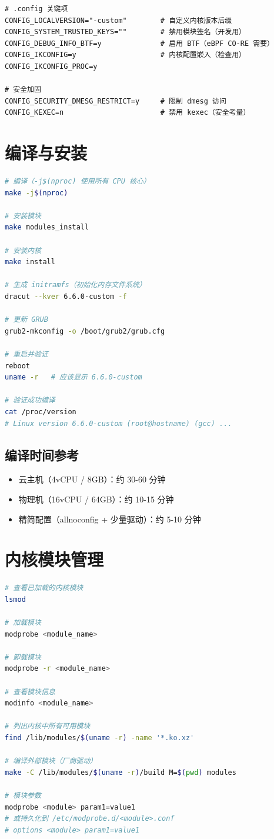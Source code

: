 \documentclass[12pt,UTF8]{ctexbook}
\begin{document}
\begin{lstlisting}
# .config 关键项
CONFIG_LOCALVERSION="-custom"        # 自定义内核版本后缀
CONFIG_SYSTEM_TRUSTED_KEYS=""        # 禁用模块签名（开发用）
CONFIG_DEBUG_INFO_BTF=y              # 启用 BTF（eBPF CO-RE 需要）
CONFIG_IKCONFIG=y                    # 内核配置嵌入（检查用）
CONFIG_IKCONFIG_PROC=y

# 安全加固
CONFIG_SECURITY_DMESG_RESTRICT=y     # 限制 dmesg 访问
CONFIG_KEXEC=n                       # 禁用 kexec（安全考量）
\end{lstlisting}

\section{编译与安装}
\label{sec:kernel-build}

\begin{lstlisting}[language=bash]
# 编译（-j$(nproc) 使用所有 CPU 核心）
make -j$(nproc)

# 安装模块
make modules_install

# 安装内核
make install

# 生成 initramfs（初始化内存文件系统）
dracut --kver 6.6.0-custom -f

# 更新 GRUB
grub2-mkconfig -o /boot/grub2/grub.cfg

# 重启并验证
reboot
uname -r   # 应该显示 6.6.0-custom

# 验证成功编译
cat /proc/version
# Linux version 6.6.0-custom (root@hostname) (gcc) ...
\end{lstlisting}

\subsection*{编译时间参考}

\begin{itemize}
    \item 云主机（4vCPU / 8GB）：约 30-60 分钟
    \item 物理机（16vCPU / 64GB）：约 10-15 分钟
    \item 精简配置（allnoconfig + 少量驱动）：约 5-10 分钟
\end{itemize}

\section{内核模块管理}
\label{sec:kernel-modules}

\begin{lstlisting}[language=bash]
# 查看已加载的内核模块
lsmod

# 加载模块
modprobe <module_name>

# 卸载模块
modprobe -r <module_name>

# 查看模块信息
modinfo <module_name>

# 列出内核中所有可用模块
find /lib/modules/$(uname -r) -name '*.ko.xz'

# 编译外部模块（厂商驱动）
make -C /lib/modules/$(uname -r)/build M=$(pwd) modules

# 模块参数
modprobe <module> param1=value1
# 或持久化到 /etc/modprobe.d/<module>.conf
# options <module> param1=value1
\end{lstlisting}
\end{document}
